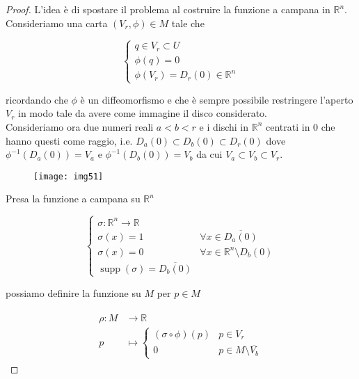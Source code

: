 \begin{proof}
	L'idea è di spostare il problema al costruire la funzione a campana in $ \mathbb{R}^{n} $.\\
	Consideriamo una carta $ (V_{r},\phi) \in M $ tale che
	
	\begin{equation}
		\begin{cases}
			q \in V_{r} \subset U\\
			\phi(q) = 0\\
			\phi(V_{r}) = D_{r}(0) \in \mathbb{R}^{n}
		\end{cases}
	\end{equation}

	ricordando che $ \phi $ è un diffeomorfismo e che è sempre possibile restringere l'aperto $ V_{r} $ in modo tale da avere come immagine il disco considerato.\\
	Consideriamo ora due numeri reali $ a < b < r $ e i dischi in $ \mathbb{R}^{n} $ centrati in 0 che hanno questi come raggio, i.e. $ D_{a}(0) \subset D_{b}(0) \subset D_{r}(0) $ dove $ \phi^{-1}(D_{a}(0)) = V_{a} $ e $ \phi^{-1}(D_{b}(0)) = V_{b} $ da cui $ V_{a} \subset V_{b} \subset V_{r} $.
	
	\begin{figure}[H]
		\centering
		\texttt{[image: img51]}
	\end{figure}	
	
	Presa la funzione a campana su $ \mathbb{R}^{n} $
	
	\begin{equation}
		\begin{cases}
			\sigma : \mathbb{R}^{n} \to \mathbb{R}\\
			\sigma(x) = 1 & \forall x \in \overline{D_{a}(0)}\\
			\sigma(x) = 0 & \forall x \in \mathbb{R}^{n} \setminus D_{b}(0)\\
			\operatorname{supp}(\sigma) = \overline{D_{b}(0)}
		\end{cases}
	\end{equation}

	possiamo definire la funzione su $ M $ per $ p \in M $
	
	\begin{align}
		\begin{split}
			\rho : M &\to \mathbb{R}\\
			p &\mapsto %
			\begin{cases}
				(\sigma \circ \phi)(p) & p \in V_{r}\\
				0 & p \in M \setminus \overline{V_{b}}
			\end{cases}
		\end{split}
	\end{align}


\end{proof}
